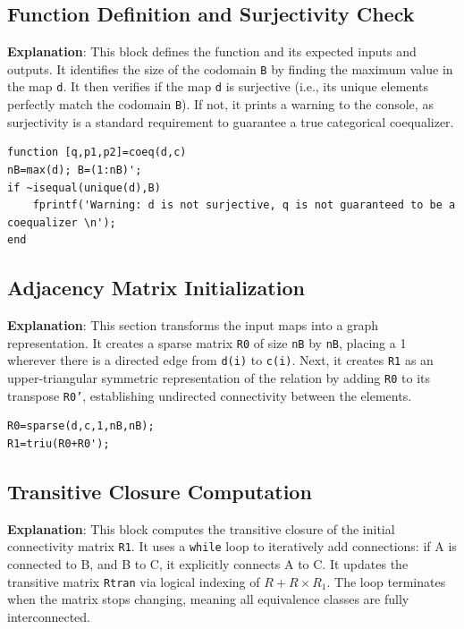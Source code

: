 \subsection{Function Definition and Surjectivity Check}
\textbf{Explanation}: This block defines the function and its expected inputs and outputs. It identifies the size of the codomain \texttt{B} by finding the maximum value in the map \texttt{d}. It then verifies if the map \texttt{d} is surjective (i.e., its unique elements perfectly match the codomain \texttt{B}). If not, it prints a warning to the console, as surjectivity is a standard requirement to guarantee a true categorical coequalizer.

\begin{lstlisting}[caption={Function Definition and Input Validation}]
function [q,p1,p2]=coeq(d,c)
nB=max(d); B=(1:nB)';
if ~isequal(unique(d),B)
    fprintf('Warning: d is not surjective, q is not guaranteed to be a coequalizer \n');
end
\end{lstlisting}

\subsection{Adjacency Matrix Initialization}
\textbf{Explanation}: This section transforms the input maps into a graph representation. It creates a sparse matrix \texttt{R0} of size \texttt{nB} by \texttt{nB}, placing a 1 wherever there is a directed edge from \texttt{d(i)} to \texttt{c(i)}. Next, it creates \texttt{R1} as an upper-triangular symmetric representation of the relation by adding \texttt{R0} to its transpose \texttt{R0'}, establishing undirected connectivity between the elements.

\begin{lstlisting}[caption={Adjacency Matrix Initialization}]
R0=sparse(d,c,1,nB,nB);
R1=triu(R0+R0');
\end{lstlisting}

\subsection{Transitive Closure Computation}
\textbf{Explanation}: This block computes the transitive closure of the initial connectivity matrix \texttt{R1}. It uses a \texttt{while} loop to iteratively add connections: if A is connected to B, and B to C, it explicitly connects A to C. It updates the transitive matrix \texttt{Rtran} via logical indexing of $R + R \times R_1$. The loop terminates when the matrix stops changing, meaning all equivalence classes are fully interconnected.

